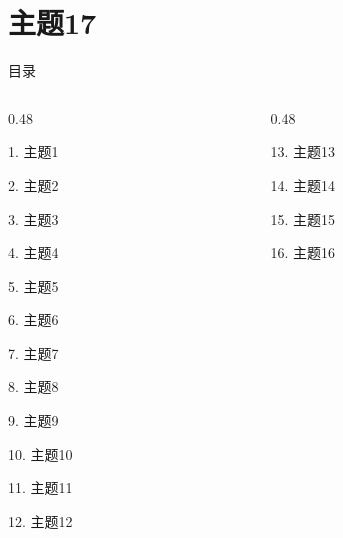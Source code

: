 \documentclass[aspectratio=169,10pt,fontset=fandol]{ctexbeamer}
\begin{document}
\section{主题17}
\begin{frame}[t,fragile]{目录}
\small
\begin{columns}[T,onlytextwidth]
\begin{column}{0.48\textwidth}
{\color{black}\small 1. 主题1\par}\vspace{0.22em}
{\color{black}\small 2. 主题2\par}\vspace{0.22em}
{\color{black}\small 3. 主题3\par}\vspace{0.22em}
{\color{black}\small 4. 主题4\par}\vspace{0.22em}
{\color{black}\small 5. 主题5\par}\vspace{0.22em}
{\color{black}\small 6. 主题6\par}\vspace{0.22em}
{\color{black}\small 7. 主题7\par}\vspace{0.22em}
{\color{black}\small 8. 主题8\par}\vspace{0.22em}
{\color{black}\small 9. 主题9\par}\vspace{0.22em}
{\color{black}\small 10. 主题10\par}\vspace{0.22em}
{\color{black}\small 11. 主题11\par}\vspace{0.22em}
{\color{black}\small 12. 主题12\par}\vspace{0.22em}
\end{column}
\begin{column}{0.48\textwidth}
{\color{black}\small 13. 主题13\par}\vspace{0.22em}
{\color{black}\small 14. 主题14\par}\vspace{0.22em}
{\color{black}\small 15. 主题15\par}\vspace{0.22em}
{\color{black}\small 16. 主题16\par}\vspace{0.22em}

\end{column}
\end{columns}
\end{frame}
\end{document}
